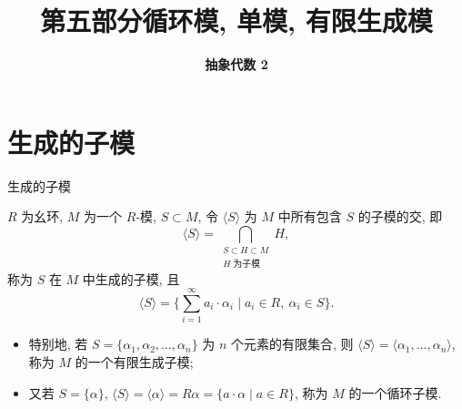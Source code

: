 \everymath{\displaystyle}



\title[第五部分\\
循环模, 单模, 有限生成模]{\texorpdfstring{\LARGE \bfseries 第五部分\quad 循环模, 单模, 有限生成模}{第五部分 循环模, 单模, 有限生成模}}
\author[抽象代数 2]{\Large \bfseries 抽象代数 2}
\date{}





\begin{frame}

\titlepage %

\end{frame}


\section[生成子模]{生成的子模}


\begin{frame}{生成的子模}

\begin{Def}[生成的子模]
$R$ 为幺环, $M$ 为一个 $R$-模, $S \subset M$, 令 $\langle S \rangle$
为 $M$ 中所有包含 $S$ 的子模的交, 即
\[
\langle S \rangle = \bigcap_{\substack{S \subset H \subset M \\ H \text{ 为子模}}} H ,
\]
称为 $S$ 在 $M$ 中生成的子模, 且
\[
\langle S \rangle = \Big\{ \sum_{i=1}^{\infty} a_i \cdot \alpha_i \;\Big|\; a_i \in R,\ \alpha_i \in S \Big\}.
\]
\end{Def}

\pause

\begin{itemize}
\item 特别地, 若 $S = \{ \alpha_1, \alpha_2, \dots, \alpha_n \}$ 为 $n$ 个元素的有限集合,
  则 $\langle S \rangle = \langle \alpha_1, \dots, \alpha_n \rangle$,
  称为 $M$ 的一个\alert{有限生成子模};
\item 又若 $S = \{ \alpha \}$, $\langle S \rangle = \langle \alpha \rangle
  = R\alpha = \{ a \cdot \alpha \mid a \in R \}$,
  称为 $M$ 的一个\alert{循环子模}.
\end{itemize}

\end{frame}

